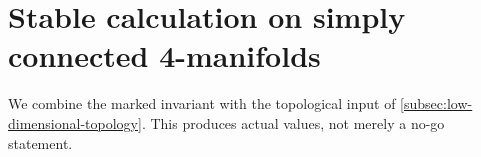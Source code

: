 \section{Stable calculation on simply connected 4-manifolds}
\label{sec:stable-calculation}

We combine the marked invariant with the topological input of
\cref{subsec:low-dimensional-topology}.  This produces actual values, not
merely a no-go statement.




